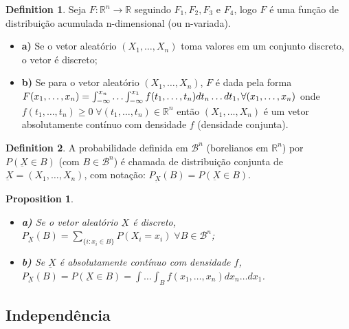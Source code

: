 \documentclass[
]{article}
\providecommand{\tightlist}{%
  \setlength{\itemsep}{0pt}\setlength{\parskip}{0pt}}
\newtheorem{proposition}{Proposition}[section]
\theoremstyle{definition}
\newtheorem{definition}{Definition}[section]
\theoremstyle{definition}
\theoremstyle{definition}
\theoremstyle{definition}
\theoremstyle{remark}
\begin{document}
\begin{definition}

Seja \(F:\mathbb{R}^{n} \to \mathbb{R}\) seguindo \(F_{1}, F_{2}, F_{3}\) e \(F_{4}\), logo \(F\) é uma função de distribuição acumulada n-dimensional (ou n-variada).

\begin{itemize}
\tightlist
\item
  \textbf{a)} Se o vetor aleatório \((X_{1},\ldots,X_{n})\) toma valores em um conjunto discreto, o vetor é discreto;
\item
  \textbf{b)} Se para o vetor aleatório \((X_{1},\ldots,X_{n})\), \(F\) é dada pela forma \(F(x_{1}, \ldots, x_{n}) = \int_{-\infty}^{x_{n}} \ldots \int_{-\infty}^{x_{1}}f(t_{1}, \ldots, t_{n}) dt_{n} \ldots dt_{1}, \\ \forall (x_{1},\ldots, x_{n})\) onde \(f(t_{1}, \ldots, t_{n}) \ge 0 \; \forall (t_{1},\ldots,t_{n}) \in \mathbb{R}^{n}\) então \((X_{1},\ldots,X_{n})\) é um vetor absolutamente contínuo com densidade \(f\) (densidade conjunta).
\end{itemize}

\end{definition}

\begin{definition}
A probabilidade definida em \(\mathcal{B}^{n}\) (borelianos em \(\mathbb{R}^{n}\)) por \(P(\underbar{X} \in B)\) (com \(B \in \mathcal{B}^{n}\)) é chamada de distribuição conjunta de \(\underbar{X} = (X_{1},\ldots,X_{n})\), com notação: \(P_{\underbar{X}}(B) = P(\underbar{X} \in B)\).
\end{definition}

\begin{proposition}
\leavevmode

\begin{itemize}
\tightlist
\item
  \textbf{a)} Se o vetor aleatório \(\underbar{X}\) é discreto, \(P_{\underbar{X}}(B) = \sum_{\{i:x_{i} \in B\}}P(X_{i} = x_{i}) \; \forall B \in \mathcal{B}^{n}\);
\item
  \textbf{b)} Se \(\underbar{X}\) é absolutamente contínuo com densidade \(f\), \(P_{\underbar{X}}(B) = P(\underbar{X} \in B) = \int \ldots \int_{B} f(x_{1}, \ldots, x_{n}) dx_{n} \ldots dx_{1}\).
\end{itemize}

\end{proposition}

\hypertarget{independuxeancia}{%
\subsection{Independência}\label{independuxeancia}}
\end{document}
